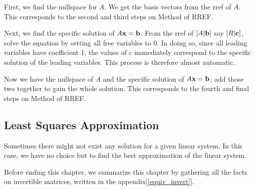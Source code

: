 \documentclass{report}
\begin{document}
			First, we find the nullspace for $A$. We get the basis vectors from the rref of $A$. This corresponds to the second and third steps on Method of RREF.
			
			Next, we find the specific solution of $A\bf{x}=\bf{b}$. From the rref of $\left[A|\bf{b}\right]$ say $\left[R|\bf{c}\right]$, solve the equation by setting all free variables to 0. In doing so, since all leading variables have coefficient 1, the values of $c$ immediately correspond to the specific solution of the leading variables. This process is therefore almost automatic.
			
			Now we have the nullspace of $A$ and the specific solution of $A\bf{x}=\bf{b}$; add those two together to gain the whole solution. This corresponds to the fourth and final steps on Method of RREF.
			
		\subsection{Least Squares Approximation}%
			Sometimes there might not exist any solution for a given linear system. In this case, we have no choice but to find the best approximation of the linear system.
		
	
	Before ending this chapter, we summarize this chapter by gathering all the facts on invertible matrices, written in the appendix[\ref{equiv_invert}].
\end{document}
